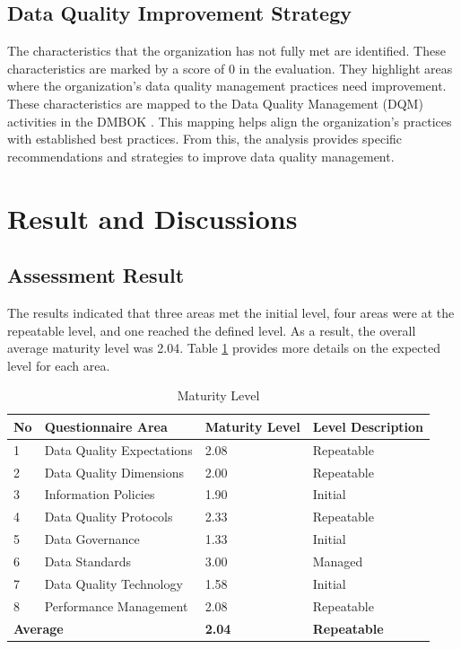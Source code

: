 \documentclass[conference]{IEEEtran}
\begin{document}
\subsection{Data Quality Improvement Strategy}
The characteristics that the organization has not fully met are identified. These characteristics are marked by a score of 0 in the evaluation. They highlight areas where the organization’s data quality management practices need improvement. These characteristics are mapped to the Data Quality Management (DQM) activities in the DMBOK \cite{DAMA_2013}. This mapping helps align the organization’s practices with established best practices. From this, the analysis provides specific recommendations and strategies to improve data quality management. 

\section{Result and Discussions}
\subsection{Assessment Result}
The results indicated that three areas met the initial level, four areas were at the repeatable level, and one reached the defined level. As a result, the overall average maturity level was 2.04. Table \ref{tab:maturity-level} provides more details on the expected level for each area.

\begin{table}[H]
\caption{Maturity Level}
\label{tab:maturity-level}
\centering
\begin{tabular}{|p{0.3cm}|p{3cm}|p{1cm}|p{2cm}|}
\hline
\textbf{No} & \textbf{Questionnaire Area} & \textbf{Maturity Level}&\textbf{Level Description} \\
\hline
1 & Data Quality Expectations & 2.08 & Repeatable\\
\hline
2 & Data Quality Dimensions & 2.00 & Repeatable\\
\hline
3 & Information Policies & 1.90 & Initial\\
\hline
4 & Data Quality Protocols & 2.33 & Repeatable \\
\hline
5 & Data Governance & 1.33 & Initial \\
\hline
6 & Data Standards & 3.00 & Managed \\
\hline
7 & Data Quality Technology & 1.58 & Initial\\
\hline
8 & Performance Management & 2.08 & Repeatable\\
\hline
\multicolumn{2}{|l|}{\textbf{Average}} & \textbf{2.04}& \textbf{Repeatable} \\
\hline
\end{tabular}
\end{table}
\end{document}
